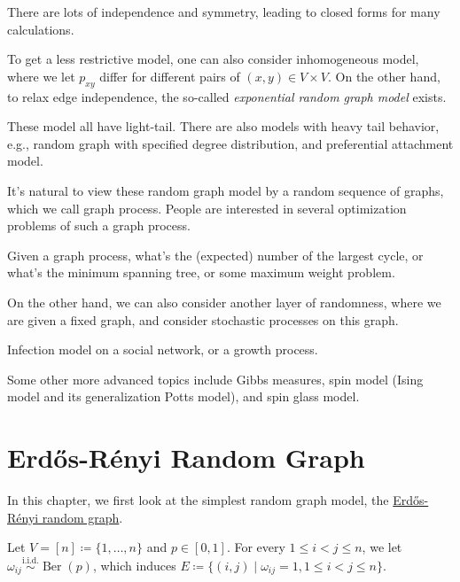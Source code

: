 \begin{note}
	There are lots of independence and symmetry, leading to closed forms for many calculations.
\end{note}

To get a less restrictive model, one can also consider inhomogeneous model, where we let \(p_{xy}\) differ for different pairs of \((x , y) \in V \times V\). On the other hand,  to relax edge independence, the so-called \emph{exponential random graph model} exists.

\begin{remark}
	These model all have light-tail. There are also models with heavy tail behavior, e.g., random graph with specified degree distribution, and preferential attachment model.
\end{remark}

It's natural to view these random graph model by a random sequence of graphs, which we call graph process. People are interested in several optimization problems of such a graph process.

\begin{eg}
	Given a graph process, what's the (expected) number of the largest cycle, or what's the minimum spanning tree, or some maximum weight problem.
\end{eg}

On the other hand, we can also consider another layer of randomness, where we are given a fixed graph, and consider stochastic processes on this graph.

\begin{eg}
	Infection model on a social network, or a growth process.
\end{eg}

Some other more advanced topics include Gibbs measures, spin model (Ising model and its generalization Potts model), and spin glass model.

\chapter{Erdős-Rényi Random Graph}
In this chapter, we first look at the simplest random graph model, the \hyperref[def:Erdős-Rényi-random-graph]{Erdős-Rényi random graph}.

\begin{prev}
	Let \(V = [n] \coloneqq \{ 1, \dots , n \} \) and \(p \in [0, 1]\). For every \(1 \leq i < j \leq n\), we let \(\omega _{ij} \overset{\text{i.i.d.} }{\sim } \operatorname{Ber}(p) \), which induces \(E \coloneqq \{ (i, j) \mid \omega _{ij} = 1, 1 \leq i < j \leq n\} \).
\end{prev}

